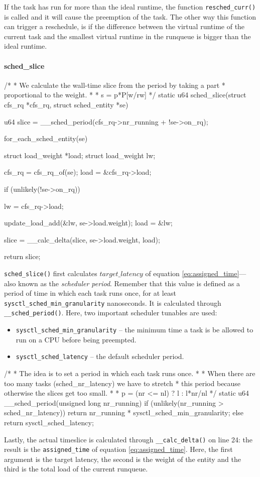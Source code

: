 If the task has run for more than the ideal runtime, the function \verb|resched_curr()| is called and it will cause the preemption of the task. The other way this function can trigger a reschedule, is if the difference between the virtual runtime of the current task and the smallest virtual runtime in the runqueue is bigger than the ideal runtime.

\paragraph{sched\_slice}
\begin{code}
/*
 * We calculate the wall-time slice from the period by taking a part
 * proportional to the weight.
 *
 * s = p*P[w/rw]
 */
static u64 sched_slice(struct cfs_rq *cfs_rq, struct sched_entity *se)
{
	u64 slice = __sched_period(cfs_rq->nr_running + !se->on_rq);

	for_each_sched_entity(se) {
		struct load_weight *load;
		struct load_weight lw;

		cfs_rq = cfs_rq_of(se);
		load = &cfs_rq->load;

		if (unlikely(!se->on_rq)) {
			lw = cfs_rq->load;

			update_load_add(&lw, se->load.weight);
			load = &lw;
		}
		slice = __calc_delta(slice, se->load.weight, load);
	}
	return slice;
}
\end{code}
\verb|sched_slice()| first calculates $target\_latency$ of equation \ref{eq:assigned_time}---also known as the \textit{scheduler period}. Remember that this value is defined as a period of time in which each task runs once, for at least \verb|sysctl_sched_min_granularity| nanoseconds. It is calculated through \verb|__sched_period()|.\label{sec:sched_period}
Here, two important scheduler tunables are used:
\begin{itemize}
    \item \verb|sysctl_sched_min_granularity| -- the minimum time a task is be allowed to run on a CPU before being preempted.
    \item \verb|sysctl_sched_latency| -- the default scheduler period.
\end{itemize}
\begin{code}
/*
 * The idea is to set a period in which each task runs once.
 *
 * When there are too many tasks (sched_nr_latency) we have to stretch
 * this period because otherwise the slices get too small.
 *
 * p = (nr <= nl) ? l : l*nr/nl
 */
static u64 __sched_period(unsigned long nr_running)
{
	if (unlikely(nr_running > sched_nr_latency))
		return nr_running * sysctl_sched_min_granularity;
	else
		return sysctl_sched_latency;
}
\end{code}
Lastly, the actual timeslice is calculated through \verb|__calc_delta()| on line 24: the result is the \verb|assigned_time| of equation \ref{eq:assigned_time}. Here, the first argument is the target latency, the second is the weight of the entity and the third is the total load of the current runqueue.


